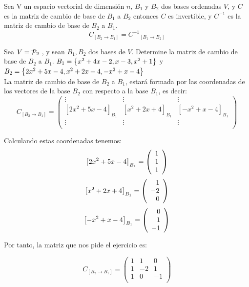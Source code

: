 \begin{theorem}[Corolario]
Sea V un espacio vectorial de dimensión $n$, $B_1$ y $B_2$  dos bases ordenadas $V$, y $C$ es la matriz de cambio de base de $B_1$ a $B_2$ entonces $C$ es invertible, y $C^{-1}$ es la matriz de cambio de base de $B_2$ a $B_1$.
\[
C_{[B_2\rightarrow B_1] }={C^{-1}}_{[B_1 \rightarrow B_2]}\]
\end{theorem}

\begin{ejemplo}
Sea $V=\mathcal{P}_2$ , y sean $B_1, B_2$ dos bases de $V$. Determine la matriz de cambio de base de $B_2$ a $B_1$. $ B_1= \left\{x^2+4x-2,x-3,x^2+1 \right\} $  y $B_2= \left\{2x^2+5x-4,x^2+2x+4,-x^2+x-4 \right\} $
~\\

La matriz de cambio de base de $B_2$ a $B_1$, estará formada por las coordenadas de los vectores de la base $B_2$ con respecto a la base $B_1$, es decir:
\[C_{[B_2 \rightarrow B_1]}= \left(\begin{array}{ccc}
\vdots & \vdots & \vdots \\
\left[2x^2+5x-4\right]_{B_1}&\left[x^2+2x+4\right]_{B_1}&  \left[-x^2+x-4\right]_{B_1}\\
\vdots & \vdots &  \vdots\\
\end{array}
\right)\]

Calculando estas coordenadas tenemos:
\[\left[2x^2+5x-4\right]_{B_1}=\left( \begin{array}{r} 1\\ 1\\ 1 \end{array} \right) \]
\[\left[x^2+2x+4\right]_{B_1}=\left( \begin{array}{r} 1\\ -2\\ 0 \end{array} \right) \]
\[\left[-x^2+x-4\right]_{B_1}=\left( \begin{array}{r} 0\\ 1\\ -1 \end{array} \right) \]

Por tanto, la matriz que nos pide el ejercicio es:

\[C_{[B_2 \rightarrow B_1]}= \left(\begin{array}{rrr}
1 & 1 & 0 \\
1&-2& 1\\
1 & 0 &  -1\\
\end{array}
\right)\]




\end{ejemplo}

